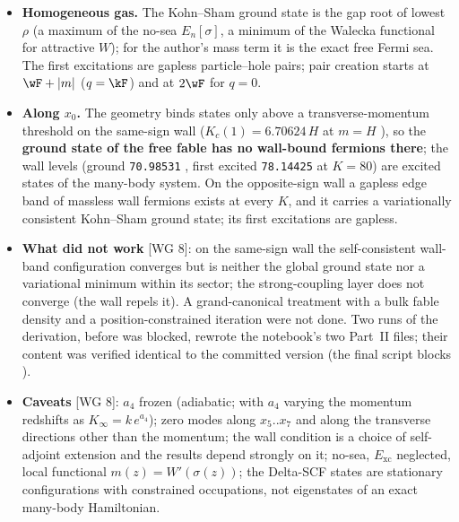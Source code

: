 \begin{itemize}
  \item \textbf{Homogeneous gas.} The Kohn--Sham ground state is the gap root of lowest $\rho$ (a maximum of
        the no-sea $E_n[\sigma]$, a minimum of the Walecka functional for attractive $W$); for the author's
        mass term it is the exact free Fermi sea. The first excitations are gapless particle--hole pairs;
        pair creation starts at $\wF+|m|$ ($q=\kF$) and at $2\wF$ for $q=0$.
  \item \textbf{Along $x_0$.} The geometry binds states only above a transverse-momentum threshold on the
        same-sign wall ($K_c(1)=6.70624\,H$ at $m=H$ ), so the \textbf{ground state of
        the free fable has no wall-bound fermions there}; the wall levels (ground \texttt{70.98531}
        , first excited \texttt{78.14425}  at $K=80$) are excited
        states of the many-body system. On the opposite-sign wall a gapless edge band of massless wall
        fermions exists at every $K$, and it carries a variationally consistent Kohn--Sham ground state; its
        first excitations are gapless.
  \item \textbf{What did not work} [WG 8]: on the same-sign wall the self-consistent wall-band configuration
        converges but is neither the global ground state nor a variational minimum within its sector; the
        strong-coupling layer does not converge (the wall repels it). A grand-canonical treatment with a bulk
        fable density and a position-constrained iteration were not done. Two runs of the derivation, before
         was blocked, rewrote the notebook's two Part~II  files; their content was
        verified identical to the committed version (the final script blocks ).
  \item \textbf{Caveats} [WG 8]: $a_4$ frozen (adiabatic; with $a_4$ varying the momentum redshifts as
        $K_\infty=k\,e^{a_4}$); zero modes along $x_5..x_7$ and along the transverse directions other than
        the momentum; the wall condition is a choice of self-adjoint extension and the results depend
        strongly on it; no-sea, $E_{\mathrm{xc}}$ neglected, local functional $m(z)=W'(\sigma(z))$; the
        Delta-SCF states are stationary configurations with constrained occupations, not eigenstates of an
        exact many-body Hamiltonian.
\end{itemize}

